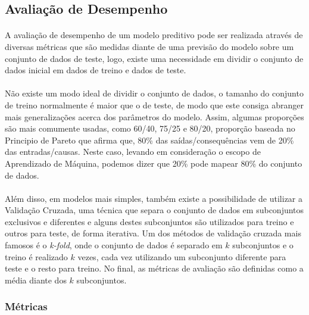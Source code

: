 \documentclass[grad,numbers]{coppe}
\begin{document}
		\subsection{Avaliação de Desempenho}
			\paragraph{}A avaliação de desempenho de um modelo preditivo pode ser realizada através de diversas métricas que são medidas diante de uma previsão do modelo sobre um conjunto de dados de teste, logo, existe uma necessidade em dividir o conjunto de dados inicial em dados de treino e dados de teste.
			\paragraph{}Não existe um modo ideal de dividir o conjunto de dados, o tamanho do conjunto de treino normalmente é maior que o de teste, de modo que este consiga abranger mais generalizações acerca dos parâmetros do modelo. Assim, algumas proporções são mais comumente usadas, como 60/40, 75/25 e 80/20, proporção baseada no Principio de Pareto que afirma que, 80\% das saídas/consequências vem de 20\% das entradas/causas\cite{pareto_principle}. Neste caso, levando em consideração o escopo de Aprendizado de Máquina, podemos dizer que 20\% pode mapear 80\% do conjunto de dados.
			\paragraph{}Além disso, em modelos mais simples, também existe a possibilidade de utilizar a Validação Cruzada, uma técnica que separa o conjunto de dados em subconjuntos exclusivos e diferentes e alguns destes subconjuntos são utilizados para treino e outros para teste, de forma iterativa. Um dos métodos de validação cruzada mais famosos é o \textit{k-fold}, onde o conjunto de dados é separado em $k$ subconjuntos e o treino é realizado $k$ vezes, cada vez utilizando um subconjunto diferente para teste e o resto para treino\cite{k-fold}. No final, as métricas de avaliação são definidas como a média diante dos $k$ subconjuntos.
			\subsubsection{Métricas}\label{sec:metricas}
\end{document}
